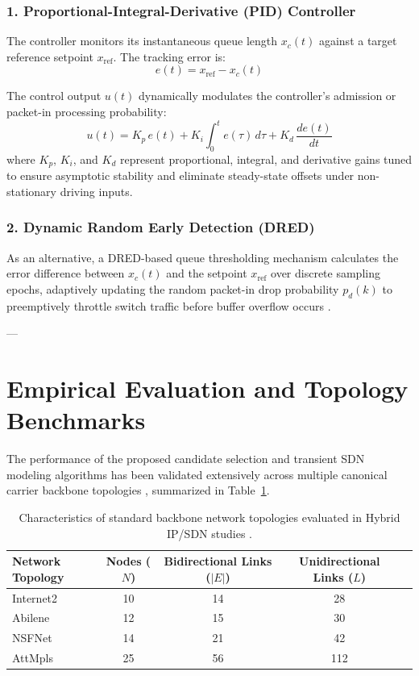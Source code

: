 \subsubsection{1. Proportional-Integral-Derivative (PID) Controller}
The controller monitors its instantaneous queue length $x_c(t)$ against a target reference setpoint $x_{\text{ref}}$. The tracking error is:
\begin{equation}
    e(t) = x_{\text{ref}} - x_c(t)
\end{equation}

The control output $u(t)$ dynamically modulates the controller's admission or packet-in processing probability:
\begin{equation}
    u(t) = K_p \, e(t) + K_i \int_0^t e(\tau) \, d\tau + K_d \, \frac{de(t)}{dt}
\end{equation}
where $K_p$, $K_i$, and $K_d$ represent proportional, integral, and derivative gains tuned to ensure asymptotic stability and eliminate steady-state offsets under non-stationary driving inputs.

\subsubsection{2. Dynamic Random Early Detection (DRED)}
As an alternative, a DRED-based queue thresholding mechanism calculates the error difference between $x_c(t)$ and the setpoint $x_{\text{ref}}$ over discrete sampling epochs, adaptively updating the random packet-in drop probability $p_d(k)$ to preemptively throttle switch traffic before buffer overflow occurs \cite{vuppalapati2021modeling}.

---

\section{Empirical Evaluation and Topology Benchmarks}
\label{sec:sdn_results}

The performance of the proposed candidate selection and transient SDN modeling algorithms has been validated extensively across multiple canonical carrier backbone topologies \cite{vuppalapati2022minimum, vuppalapati2025candidate}, summarized in Table~\ref{tab:sdn_topologies}.

\begin{table}[htbp]
\centering
\caption{Characteristics of standard backbone network topologies evaluated in Hybrid IP/SDN studies \cite{vuppalapati2022minimum, vuppalapati2025candidate}.}
\label{tab:sdn_topologies}
\begin{tabular}{lcccc}
\toprule
\textbf{Network Topology} & \textbf{Nodes ($N$)} & \textbf{Bidirectional Links ($|E|$)} & \textbf{Unidirectional Links ($L$)} \\
\midrule
Internet2   & 10 & 14 & 28 \\
Abilene     & 12 & 15 & 30 \\
NSFNet      & 14 & 21 & 42 \\
AttMpls     & 25 & 56 & 112 \\
\bottomrule
\end{tabular}
\end{table}

